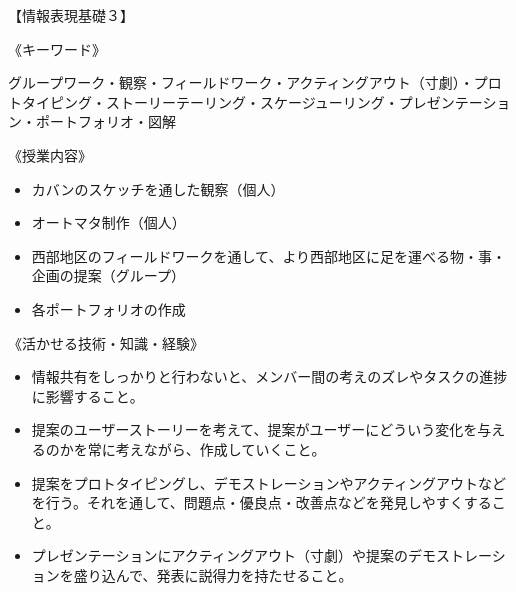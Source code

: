 \documentclass[openany,11pt,papersize]{jsbook}
\begin{document}
\begin{appendix}
\par【情報表現基礎３】
\par《キーワード》
\par グループワーク・観察・フィールドワーク・アクティングアウト（寸劇）・プロトタイピング・ストーリーテーリング・スケージューリング・プレゼンテーション・ポートフォリオ・図解
\par《授業内容》
\begin{itemize}
\item カバンのスケッチを通した観察（個人）
\item オートマタ制作（個人）
\item 西部地区のフィールドワークを通して、より西部地区に足を運べる物・事・企画の提案（グループ）
\item 各ポートフォリオの作成
\end{itemize}
\par《活かせる技術・知識・経験》
\begin{itemize}
\item 情報共有をしっかりと行わないと、メンバー間の考えのズレやタスクの進捗に影響すること。
\item 提案のユーザーストーリーを考えて、提案がユーザーにどういう変化を与えるのかを常に考えながら、作成していくこと。
\item 提案をプロトタイピングし、デモストレーションやアクティングアウトなどを行う。それを通して、問題点・優良点・改善点などを発見しやすくすること。
\item プレゼンテーションにアクティングアウト（寸劇）や提案のデモストレーションを盛り込んで、発表に説得力を持たせること。
\end{itemize} 




\end{appendix}
\end{document}
